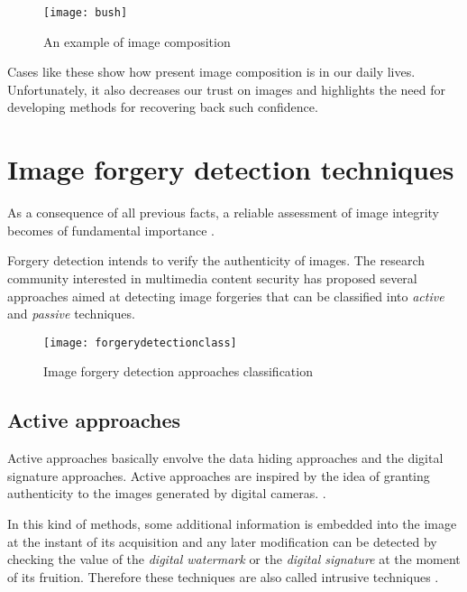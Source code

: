 \begin{figure}[!h]
  \begin{center}
    \texttt{[image: bush]}
  \end{center}
  \caption{An example of image composition}\label{fig:bush}
\end{figure}

Cases like these show how present image composition is in our daily lives. Unfortunately, it also decreases our trust on images and highlights the need for developing methods for recovering back such confidence.

\section{Image forgery detection techniques}

As a consequence of all previous facts, a reliable assessment of image integrity becomes of fundamental importance\cite{zhu2004seeing} \cite{farid2009digital} \cite{piva2013overview}.

Forgery detection intends to verify the authenticity of images.  The research community interested in multimedia content security has proposed several approaches aimed at detecting image forgeries that can be classified into \emph{active} and \emph{passive} techniques.

\begin{figure}[!h]
  \begin{center}
    \texttt{[image: forgerydetectionclass]}
  \end{center}
  \caption{Image forgery detection approaches classification}
    \label{fig:forgerydetectionclass}
\end{figure}

\subsection{Active approaches}

Active approaches basically envolve the data hiding approaches and the digital signature approaches. Active approaches are inspired by the idea of granting authenticity to the images generated by digital cameras. \cite{friedman1993trustworthy} \cite{blythe2004secure}. 

In this kind of methods, some additional information is embedded into the image at the instant of its acquisition and any later modification can be detected by checking the value of the \emph{digital watermark} \cite{cox2002digital}\cite{katzenbeisser2000information}\cite{cox2007digital} or the \emph{digital signature}\cite{rivest1978method}\cite{pointcheval2000security}\cite{nikolaidis1996copyright} at the moment of its fruition. Therefore these techniques are also called intrusive techniques \cite{mahdian2010bibliography}. 

